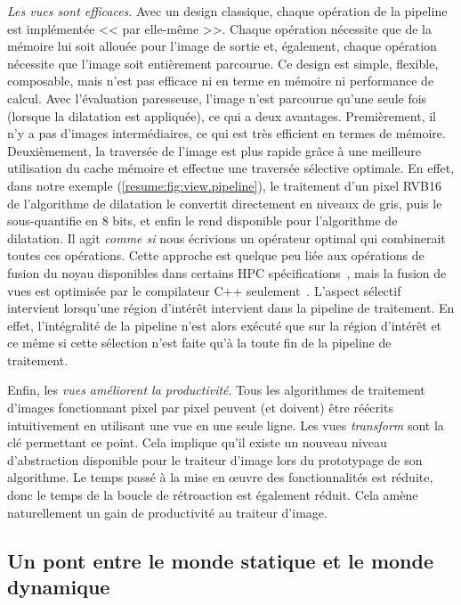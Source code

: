 \emph{Les vues sont efficaces}. Avec un design classique, chaque opération de la pipeline est implémentée << par
elle-même >>. Chaque opération nécessite que de la mémoire lui soit allouée pour l'image de sortie et, également, chaque
opération nécessite que l'image soit entièrement parcourue. Ce design est simple, flexible, composable, mais n'est pas
efficace ni en terme en mémoire ni performance de calcul. Avec l'évaluation paresseuse, l'image n'est parcourue qu'une
seule fois (lorsque la dilatation est appliquée), ce qui a deux avantages. Premièrement, il n'y a pas d'images
intermédiaires, ce qui est très efficient en termes de mémoire. Deuxièmement, la traversée de l'image est plus rapide
grâce à une meilleure utilisation du cache mémoire et effectue une traversée sélective optimale. En effet, dans notre
exemple (\cref{resume:fig:view.pipeline}), le traitement d'un pixel RVB16 de l'algorithme de dilatation le convertit
directement en niveaux de gris, puis le sous-quantifie en 8 bits, et enfin le rend disponible pour l'algorithme de
dilatation. Il agit \emph{comme si} nous écrivions un opérateur optimal qui combinerait toutes ces opérations. Cette
approche est quelque peu liée aux opérations de fusion du noyau disponibles dans certains HPC
spécifications~\parencite{openvx.2019}, mais la fusion de vues est optimisée par le compilateur C++
seulement~\parencite{brown.2018.ranges}. L'aspect sélectif intervient lorsqu'une région d'intérêt intervient dans la
pipeline de traitement. En effet, l'intégralité de la pipeline n'est alors exécuté que sur la région d'intérêt et ce
même si cette sélection n'est faite qu'à la toute fin de la pipeline de traitement.

Enfin, les \emph{vues améliorent la productivité}. Tous les algorithmes de traitement d'images fonctionnant pixel par
pixel peuvent (et doivent) être réécrits intuitivement en utilisant une vue en une seule ligne. Les vues
\emph{transform} sont la clé permettant ce point. Cela implique qu'il existe un nouveau niveau d'abstraction disponible
pour le traiteur d'image lors du prototypage de son algorithme. Le temps passé à la mise en \oe{}uvre des
fonctionnalités est réduite, donc le temps de la boucle de rétroaction est également réduit. Cela amène naturellement un
gain de productivité au traiteur d'image.


\subsection*{Un pont entre le monde statique et le monde dynamique}


